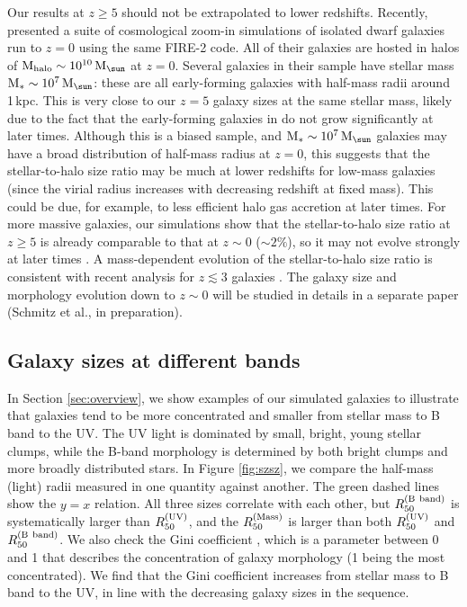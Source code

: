 \documentclass[useAMS,usenatbib]{mn2e}
\newcommand{\Mhalo}{{\rm M}_{\rm halo}}
\newcommand{\Ms}{{\rm M}_{\ast}}
\newcommand{\Msun}{{\rm M}_{\sun}}
\begin{document}
Our results at $z\geq5$ should not be extrapolated to lower redshifts. Recently, \citet{fitts.2017:field.dwarf.galaxy} presented a suite of cosmological zoom-in simulations of isolated dwarf galaxies run to $z=0$ using the same FIRE-2 code. All of their galaxies are hosted in halos of $\Mhalo\sim10^{10}\,\Msun$ at $z=0$. Several galaxies in their sample have stellar mass $\Ms\sim10^7\,\Msun$: these are all early-forming galaxies with half-mass radii around 1\,kpc. This is very close to our $z=5$ galaxy sizes at the same stellar mass, likely due to the fact that the early-forming galaxies in \citet{fitts.2017:field.dwarf.galaxy} do not grow significantly at later times. Although this is a biased sample, and $\Ms\sim10^7\,\Msun$ galaxies may have a broad distribution of half-mass radius at $z=0$, this suggests that the stellar-to-halo size ratio may be much at lower redshifts for low-mass galaxies (since the virial radius increases with decreasing redshift at fixed mass). This could be due, for example, to less efficient halo gas accretion at later times. For more massive galaxies, our simulations show that the stellar-to-halo size ratio at $z\geq5$ is already comparable to that at $z\sim0$ ($\sim2\%$), so it may not evolve strongly at later times \citep[e.g.][]{shibuya.2015:legacy.size.evolution}. A mass-dependent evolution of the stellar-to-halo size ratio is consistent with recent analysis for $z\lesssim3$ galaxies \citep[e.g.][]{somerville.2018:size.halo.evolution}. The galaxy size and morphology evolution down to $z\sim0$ will be studied in details in a separate paper (Schmitz et al., in preparation).

\subsection{Galaxy sizes at different bands}
\label{sec:szsz}
In Section \ref{sec:overview}, we show examples of our simulated galaxies to illustrate that galaxies tend to be more concentrated and smaller from stellar mass to B band to the UV. The UV light is dominated by small, bright, young stellar clumps, while the B-band morphology is determined by both bright clumps and more broadly distributed stars. In Figure \ref{fig:szsz}, we compare the half-mass (light) radii measured in one quantity against another. The green dashed lines show the $y=x$ relation. All three sizes correlate with each other, but $R_{50}^{\rm (B~band)}$ is systematically larger than $R_{50}^{\rm (UV)}$, and the $R_{50}^{\rm (Mass)}$ is larger than both $R_{50}^{\rm (UV)}$ and $R_{50}^{\rm (B~band)}$. We also check the Gini coefficient \citep[e.g.][]{lotz.2004:non.parametric.morph}, which is a parameter between 0 and 1 that describes the concentration of galaxy morphology (1 being the most concentrated). We find that the Gini coefficient increases from stellar mass to B band to the UV, in line with the decreasing galaxy sizes in the sequence.
\end{document}
